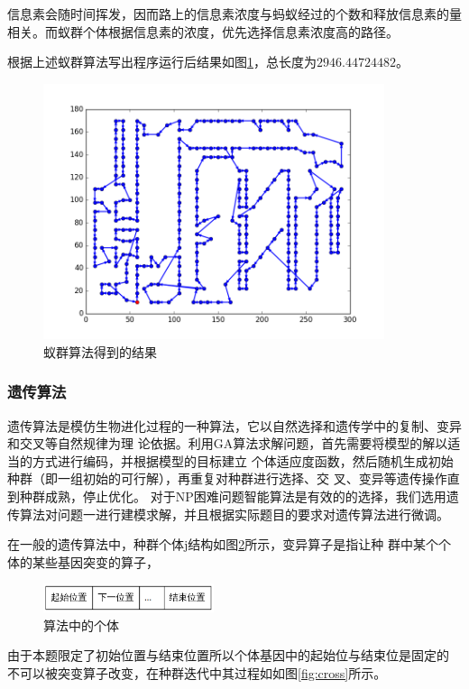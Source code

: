 \documentclass[fontset=windows,a4paper,12pt]{ctexart}
\begin{document}
			信息素会随时间挥发，因而路上的信息素浓度与蚂蚁经过的个数和释放信息素的量相关。而蚁群个体根据信息素的浓度，优先选择信息素浓度高的路径。
			
			根据上述蚁群算法写出程序运行后结果如图\ref{fig:anti}，总长度为$2946.44724482$。
    	   \begin{figure}[htbp]
    	   	 \centering
    	   	 \includegraphics[width=10cm]{pic/anti_result.png}
    	   	 \caption{蚁群算法得到的结果}
    	   	 \label{fig:anti}
    	   \end{figure}
    	 
      \subsubsection{遗传算法}
      
      遗传算法是模仿生物进化过程的一种算法，它以自然选择和遗传学中的复制、变异和交叉等自然规律为理
      论依据。利用GA算法求解问题，首先需要将模型的解以适当的方式进行编码，并根据模型的目标建立
      个体适应度函数，然后随机生成初始种群（即一组初始的可行解），再重复对种群进行选择、交
      叉、变异等遗传操作直到种群成熟，停止优化\cite{赵静2008数学建模与数学实验}。
      对于NP困难问题智能算法是有效的的选择，我们选用遗传算法对问题一进行建模求解，并且根据实际题目的要求对遗传算法进行微调。
        
      在一般的遗传算法中，种群个体j结构如图\ref{fig:life}所示，变异算子是指让种
      群中某个个体的某些基因突变的算子，
		\begin{figure}[htbp]
			\centering
			\includegraphics[width=5cm]{pic/life_struct.png}
			\caption{算法中的个体}
			\label{fig:life}
		\end{figure}
        由于本题限定了初始位置与结束位置所以个体基因中的起始位与结束位是固定的
        不可以被突变算子改变，在种群迭代中其过程如如图\ref{fig:cross}所示。
		
\end{document}
